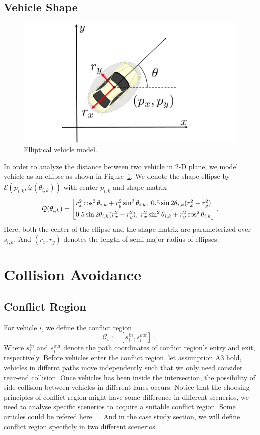 \documentclass[letterpaper, 10 pt, conference]{ieeeconf}
\begin{document}
\subsection{Vehicle Shape}
\begin{figure}[htbp!]
	\centering
	\includegraphics[width = 0.8\linewidth]{pic/car}
	\caption{Elliptical vehicle model.}
	\label{fig::car}
\end{figure}
In order to analyze the distance between two vehicle in 2-D plane, we model vehicle as an ellipse as shown in Figure~\ref{fig::car}.
We denote the shape ellipse by $\mathcal{E}(p_{i,k},\mathcal{Q}(\theta_{i,k}))$
with center $p_{i,k}$ and shape matrix
\begin{equation}\notag
\mathcal{Q}(\theta_{i,k})=
\begin{bmatrix}
r_{x}^2\cos^2 \theta_{i,k}+r_{y}^2\sin^2 \theta_{i,k} , \;
0.5\sin 2\theta_{i,k}(r_{x}^2-r_{y}^2) \\[0.16cm]
0.5\sin 2\theta_{i,k}(r_{x}^2-r_{y}^2) ,\;
r_{x}^2\sin^2 \theta_{i,k}+r_{y}^2\cos^2 \theta_{i,k}
\end{bmatrix}.
\end{equation}
Here, both the center of the ellipse and the shape matrix are parameterized over $s_{i,k}$. And $(r_{x}, r_{y})$ denotes the length of semi-major radius of ellipses.


\section{Collision Avoidance}
\label{sec::cons}
\subsection{Conflict Region}
For vehicle $i$, we define the conflict region 
\[
\mathcal{C}_i:=[s_i^{in},s_i^{out}]\;,
\]
 Where $s_i^{in}$ and $s_i^{out}$ denote the path coordinates of conflict region's entry and exit, respectively. Before vehicles enter the conflict region, let assumption A3 hold, vehicles in differnt paths move independently such that we only need consider rear-end collision. Once vehicles has been inside the intersection, the possibility of side collision between vehicles in different lanes occurs. Notice that the choosing principles of conflict region might have some difference in different scenerios, we need to analyse specific scenerios to acquire a suitable conflict region. Some articles could be refered here~\cite{Hult2019}~\cite{Katriniok2019}. And in the case study section, we will define conflict region specificly in two different scenerios.
\end{document}
